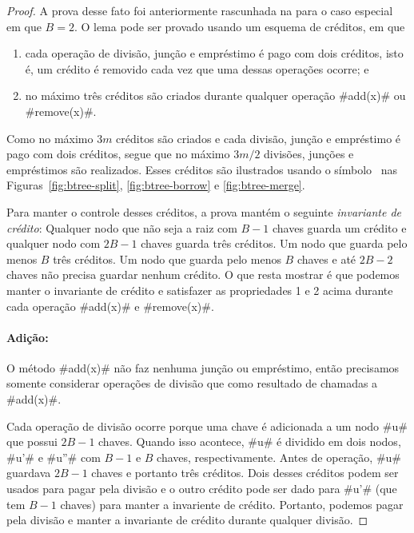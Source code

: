 \begin{proof}
  A prova desse fato foi anteriormente rascunhada na
    para o caso especial em que $B=2$.
   O lema pode ser provado usando um esquema de créditos,
   em que
  \begin{enumerate}
    \item cada operação de divisão, junção e empréstimo é pago com dois créditos, isto é, um crédito é removido cada vez que uma dessas operações ocorre; e 
    \item no máximo três créditos são criados durante qualquer operação #add(x)# ou
      #remove(x)#.
  \end{enumerate}
  Como no máximo $3m$ créditos são criados e cada divisão, junção e
  empréstimo é pago com dois créditos, segue que no máximo
  $3m/2$ divisões, junções e empréstimos são realizados. 
  Esses créditos são ilustrados usando o símbolo
 \cent\ nas
  Figuras~\ref{fig:btree-split}, \ref{fig:btree-borrow} e
  \ref{fig:btree-merge}.

  Para manter o controle desses créditos, a prova mantém
  o seguinte \emph{invariante de crédito}:
  Qualquer nodo que não seja a raiz com $B-1$ chaves guarda um crédito 
  e qualquer nodo com 
  $2B-1$ chaves guarda três créditos. Um nodo que guarda pelo menos
  $B$ três créditos.
  Um nodo que guarda pelo menos $B$ chaves e até 
$2B-2$ chaves não precisa guardar nenhum crédito.
  O que resta mostrar é  que podemos manter o invariante de crédito e satisfazer as propriedades 1 e 2 acima durante cada operação 
#add(x)#
  e #remove(x)#.

  \paragraph{Adição:}
  O método #add(x)# não faz nenhuma junção ou empréstimo, então
  precisamos somente considerar operações de divisão que como resultado de chamadas a #add(x)#.

  Cada operação de divisão ocorre porque uma chave é adicionada a um nodo #u#
  que possui
  $2B-1$ chaves. Quando isso acontece, #u# é dividido em dois nodos, #u'# e #u''# com $B-1$ e $B$ chaves, respectivamente.  Antes de operação, #u# guardava
  $2B-1$ chaves e portanto três créditos. 
  Dois desses créditos podem ser usados para pagar pela divisão e o outro
  crédito pode ser dado para #u'# (que tem $B-1$ chaves) para manter a
  invariente de crédito. Portanto, podemos pagar pela divisão e manter
  a invariante de crédito durante qualquer divisão.


\end{proof}
